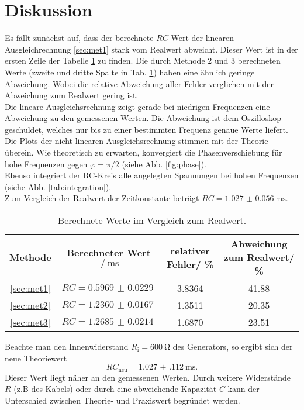 \section{Diskussion}
\label{sec:Diskussion}

Es fällt zunächst auf, dass der berechnete $RC$ Wert der linearen Ausgleichrechnung \ref{sec:met1} stark vom Realwert abweicht.
Dieser Wert ist in der ersten Zeile der Tabelle \ref{tab:fehler} zu finden.
Die durch Methode 2 und 3 berechneten Werte (zweite und dritte Spalte in Tab. \ref{tab:fehler}) haben eine ähnlich geringe Abweichung.
Wobei die relative Abweichung aller Fehler verglichen mit der Abweichung zum Realwert gering ist.\\
Die lineare Ausgleichsrechnung zeigt gerade bei niedrigen Frequenzen eine Abweichung zu den gemessenen Werten.
Die Abweichung ist dem Oszilloskop geschuldet, welches nur bis zu einer bestimmten Frequenz genaue Werte liefert.\\
Die Plots der nicht-linearen Ausgleichsrechnung stimmen mit der Theorie überein.
Wie theoretisch zu erwarten, konvergiert die Phasenverschiebung für hohe Frequenzen gegen $\varphi = \pi / 2$ (siehe Abb. \ref{fig:phase}).\\
Ebenso integriert der RC-Kreis alle angelegten Spannungen bei hohen Frequenzen (siehe Abb. \ref{tab:integration}).
\\
Zum Vergleich der Realwert der Zeitkonstante beträgt $ RC = \SI{1.027(56)}{\milli \second}$.
\begin{table}
\centering
\caption{Berechnete Werte im Vergleich zum Realwert.}
\begin{tabular}{c|ccc}
    \toprule
    Methode & Berechneter Wert $ \:/\: \si{\milli\second} $ & relativer Fehler\:/\: \% & Abweichung zum Realwert\:/\: \%\\
    \midrule
    \ref{sec:met1} & $RC = \SI{0.5969(229)}{}$ & 3.8364 & 41.88\\
    \ref{sec:met2} & $RC = \SI{1.2360(167)}{}$ & 1.3511 & 20.35\\
    \ref{sec:met3} & $RC = \SI{1.2685(214)}{}$ & 1.6870 & 23.51\\ 
    \bottomrule
\end{tabular}
\label{tab:fehler}
\end{table}
\FloatBarrier
Beachte man den Innenwiderstand $R_\text{i}=\SI{600}{\ohm}$ des Generators, so ergibt sich der neue Theoriewert
\begin{equation*}
    RC_\text{neu} = \SI{1.027(112)}{\milli\second}.
\end{equation*}
Dieser Wert liegt näher an den gemessenen Werten. Durch weitere Widerstände $R$ (z.B des Kabels) oder durch eine abweichende Kapazität $C$
kann der Unterschied zwischen Theorie- und Praxiswert begründet werden.